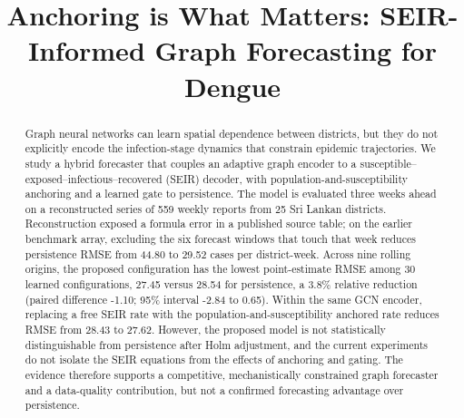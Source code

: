 \documentclass[conference]{IEEEtran}
\begin{document}
\title{Anchoring is What Matters: SEIR-Informed Graph Forecasting for Dengue}

\author{
}

\maketitle

\begin{abstract}
Graph neural networks can learn spatial dependence between districts, but they do not explicitly encode the infection-stage dynamics that constrain epidemic trajectories.
We study a hybrid forecaster that couples an adaptive graph encoder to a susceptible--exposed--infectious--recovered (SEIR) decoder, with population-and-susceptibility anchoring and a learned gate to persistence.
The model is evaluated three weeks ahead on a reconstructed series of 559 weekly reports from 25 Sri Lankan districts. %
Reconstruction exposed a formula error in a published source table; on the earlier benchmark array, excluding the six forecast windows that touch that week reduces persistence RMSE from 44.80 to 29.52 cases per district-week. %
Across nine rolling origins, the proposed configuration has the lowest point-estimate RMSE among 30 learned configurations, 27.45 versus 28.54 for persistence, a 3.8\% relative reduction (paired difference -1.10; 95\% interval -2.84 to 0.65). %
Within the same GCN encoder, replacing a free SEIR rate with the population-and-susceptibility anchored rate reduces RMSE from 28.43 to 27.62. %
However, the proposed model is not statistically distinguishable from persistence after Holm adjustment, and the current experiments do not isolate the SEIR equations from the effects of anchoring and gating. %
The evidence therefore supports a competitive, mechanistically constrained graph forecaster and a data-quality contribution, but not a confirmed forecasting advantage over persistence.
\end{abstract}
\end{document}
